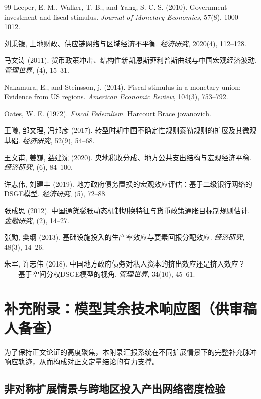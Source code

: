\documentclass[12pt,UTF8]{ctexart}
\begin{document}
\begin{thebibliography}{99}
		Leeper, E. M., Walker, T. B., and Yang, S.-C. S. (2010). Government investment and fiscal stimulus. \textit{Journal of Monetary Economics}, 57(8), 1000--1012.
		
		刘秉镰, 土地财政、供应链网络与区域经济不平衡. \textit{经济研究}, 2020(4), 112--128.
		
		马文涛 (2011). 货币政策冲击、结构性新凯恩斯菲利普斯曲线与中国宏观经济波动. \textit{管理世界}, (4), 15--31.
		
		Nakamura, E., and Steinsson, j. (2014). Fiscal stimulus in a monetary union: Evidence from US regions. \textit{American Economic Review}, 104(3), 753--792.
		
		Oates, W. E. (1972). \textit{Fiscal Federalism}. Harcourt Brace jovanovich.
		
		王曦, 邹文理, 冯邦彦 (2017). 转型时期中国不确定性规则泰勒规则的扩展及其微观基础. \textit{经济研究}, 52(9), 54--68.
		
		王文甫, 姜巍, 益建沈 (2020). 央地税收分成、地方公共支出结构与宏观经济平稳. \textit{经济研究}, (6), 84--100.
		
		许志伟, 刘建丰 (2019). 地方政府债务置换的宏观效应评估：基于二级银行网络的DSGE模型. \textit{经济研究}, (5), 72--88.
		
		张成思 (2012). 中国通货膨胀动态机制切换特征与货币政策通胀目标制规则估计. \textit{金融研究}, (2), 14--27.
		
		张勋, 樊纲 (2013). 基础设施投入的生产率效应与要素回报分配效应. \textit{经济研究}, 48(3), 14--26.
		
		朱军, 许志伟 (2018). 中国地方政府债务对私人资本的挤出效应还是挤入效应？——基于空间分权DSGE模型的视角. \textit{管理世界}, 34(10), 45--61.
		
	\end{thebibliography}
	
	\newpage
	\appendix
	\section{补充附录：模型其余技术响应图（供审稿人备查）}
	
	为了保持正文论证的高度聚焦，本附录汇报系统在不同扩展情景下的完整补充脉冲响应轨迹，从而构成对正文定量结论的有力支撑。
	
	\subsection{非对称扩展情景与跨地区投入产出网络密度检验}
	
\end{document}
